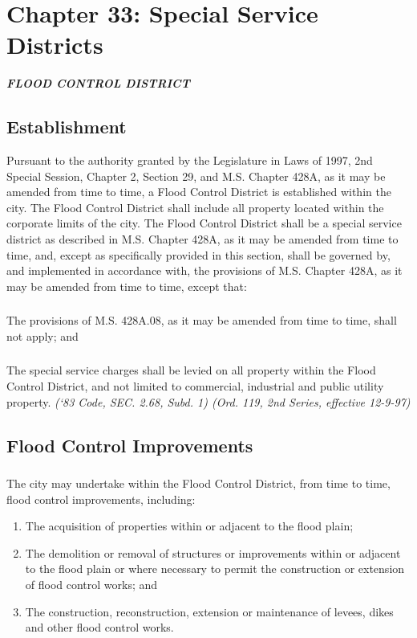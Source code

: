 %
\chapter*{Chapter 33: \newline
	Special Service Districts}

\centerline{\textbf{\emph{\LARGE{FLOOD CONTROL DISTRICT}}}}
\section{Establishment}
Pursuant to the authority granted by the Legislature in Laws of 1997, 2nd Special Session, Chapter 2, Section 29, and M.S. Chapter 428A, as it may be amended from time to time, a Flood Control District is established within the city.  The Flood Control District shall include all property located within the corporate limits of the city.  The Flood Control District shall be a special service district as described in M.S. Chapter 428A, as it may be amended from time to time, and, except as specifically provided in this section, shall be governed by, and implemented in accordance with, the provisions of M.S. Chapter 428A, as it may be amended from time to time, except that:
\subsection{}
The provisions of M.S. \textsection 428A.08, as it may be amended from time to time, shall not apply; and
\subsection{}
The special service charges shall be levied on all property within the Flood Control District, and not limited to commercial, industrial and public utility property.\newline
\emph{(‘83 Code, SEC. 2.68, Subd. 1)  (Ord. 119, 2nd Series, effective 12-9-97)}
\section{Flood Control Improvements}
\subsection{}
The city may undertake within the Flood Control District, from time to time, flood control improvements, including:
\begin{enumerate}
\item The acquisition of properties within or adjacent to the flood plain;
\item The demolition or removal of structures or improvements within or adjacent to the flood plain or where necessary to permit the construction or extension of flood control works; and
\item The construction, reconstruction, extension or maintenance of levees, dikes and other flood control works.
\end{enumerate}
